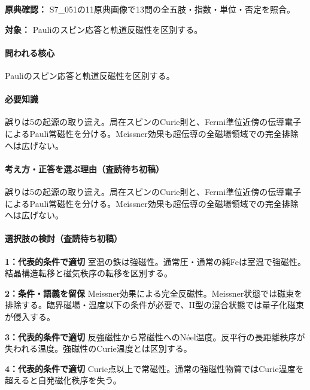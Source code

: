 \noindent\textbf{原典確認：} S7\_051の11原典画像で13問の全五肢・指数・単位・否定を照合。\par

\noindent\textbf{対象：} Pauliのスピン応答と軌道反磁性を区別する。\par

\paragraph{問われる核心} Pauliのスピン応答と軌道反磁性を区別する。

\paragraph{必要知識} 誤りは5の起源の取り違え。局在スピンのCurie則と、Fermi準位近傍の伝導電子によるPauli常磁性を分ける。Meissner効果も超伝導の全磁場領域での完全排除へは広げない。

\paragraph{考え方・正答を選ぶ理由（査読待ち初稿）} 誤りは5の起源の取り違え。局在スピンのCurie則と、Fermi準位近傍の伝導電子によるPauli常磁性を分ける。Meissner効果も超伝導の全磁場領域での完全排除へは広げない。

\paragraph{選択肢の検討（査読待ち初稿）}\mbox{}\par

\noindent\textbf{1：代表的条件で適切} 室温の鉄は強磁性。通常圧・通常の純Feは室温で強磁性。結晶構造転移と磁気秩序の転移を区別する。\par

\noindent\textbf{2：条件・語義を留保} Meissner効果による完全反磁性。Meissner状態では磁束を排除する。臨界磁場・温度以下の条件が必要で、II型の混合状態では量子化磁束が侵入する。\par

\noindent\textbf{3：代表的条件で適切} 反強磁性から常磁性へのNéel温度。反平行の長距離秩序が失われる温度。強磁性のCurie温度とは区別する。\par

\noindent\textbf{4：代表的条件で適切} Curie点以上で常磁性。通常の強磁性物質ではCurie温度を超えると自発磁化秩序を失う。\par

